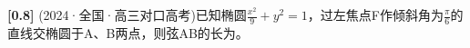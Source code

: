 \documentclass[varwidth=16cm, border=2mm]{standalone}
\begin{document}
\textbf{[0.8]} (2024·全国·高三对口高考)已知椭圆$\frac{x^2}{9} + y^2 = 1$，过左焦点F作倾斜角为$\frac{\pi}{6}$的直线交椭圆于A、B两点，则弦AB的长为\underline{\hspace{1.5cm}}。
\end{document}
